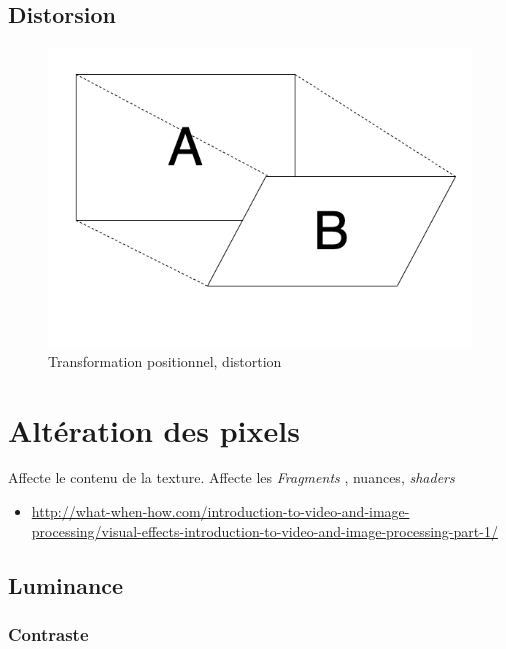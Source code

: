 \documentclass[
  french,
]{book}
\providecommand{\tightlist}{%
  \setlength{\itemsep}{0pt}\setlength{\parskip}{0pt}}
\begin{document}
\hypertarget{distorsion}{%
\subsection{Distorsion}\label{distorsion}}

\begin{figure}
\centering
\includegraphics{medias/traiter/figures/dia_transfogeo_distortion.png}
\caption{Transformation positionnel, distortion}
\end{figure}

\hypertarget{altuxe9ration-des-pixels}{%
\section{Altération des pixels}\label{altuxe9ration-des-pixels}}

Affecte le contenu de la texture.
Affecte les \emph{Fragments} , nuances, \emph{shaders}

\begin{itemize}
\tightlist
\item
  \url{http://what-when-how.com/introduction-to-video-and-image-processing/visual-effects-introduction-to-video-and-image-processing-part-1/}
\end{itemize}

\hypertarget{luminance}{%
\subsection{Luminance}\label{luminance}}

\hypertarget{contraste}{%
\subsubsection{Contraste}\label{contraste}}
\end{document}
